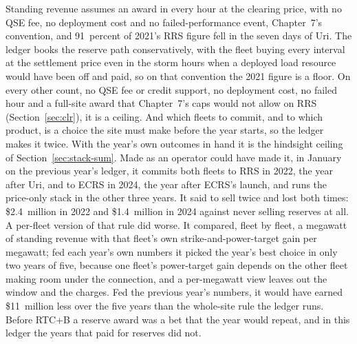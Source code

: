 Standing revenue assumes an award in every hour at the clearing price, with no QSE fee, no deployment cost and no failed-performance event, Chapter~7's convention, and 91~percent of 2021's RRS figure fell in the seven days of Uri. %
The ledger books the reserve path conservatively, with the fleet buying every interval at the settlement price even in the storm hours when a deployed load resource would have been off and paid, so on that convention the 2021 figure is a floor. On every other count, no QSE fee or credit support, no deployment cost, no failed hour and a full-site award that Chapter~7's caps would not allow on RRS (Section~\ref{sec:clr}), it is a ceiling. And which fleets to commit, and to which product, is a choice the site must make before the year starts, so the ledger makes it twice. With the year's own outcomes in hand it is the hindsight ceiling of Section~\ref{sec:stack-sum}. Made as an operator could have made it, in January on the previous year's ledger, it commits both fleets to RRS in 2022, the year after Uri, and to ECRS in 2024, the year after ECRS's launch, and runs the price-only stack in the other three years. It said to sell twice and lost both times: \$2.4~million in 2022 and \$1.4~million in 2024 against never selling reserves at all. %
A per-fleet version of that rule did worse. It compared, fleet by fleet, a megawatt of standing revenue with that fleet's own strike-and-power-target gain per megawatt; fed each year's own numbers it picked the year's best choice in only two years of five, because one fleet's power-target gain depends on the other fleet making room under the connection, and a per-megawatt view leaves out the window and the charges. Fed the previous year's numbers, it would have earned \$11~million less over the five years than the whole-site rule the ledger runs. %
Before RTC+B a reserve award was a bet that the year would repeat, and in this ledger the years that paid for reserves did not.

